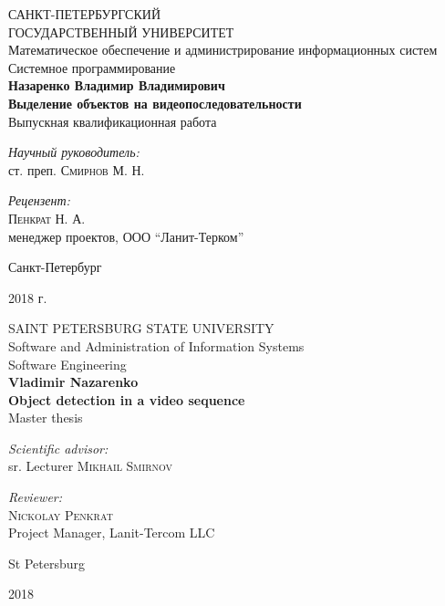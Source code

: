 \documentclass[aps,%
14pt,%
final,%
oneside,
onecolumn,%
musixtex, %
superscriptaddress,%
centertags]{extarticle} %
\begin{document}
\begin{titlepage} 
\begin{center}
{\large САНКТ-ПЕТЕРБУРГСКИЙ \\ ГОСУДАРСТВЕННЫЙ УНИВЕРСИТЕТ} \\[1.0cm]
{\large Математическое обеспечение и администрирование информационных систем} \\[0.2cm]
{\large Системное программирование} \\[3.5cm]
 
\textbf{\Large Назаренко Владимир Владимирович} \\[1cm]
\textbf{\LARGE Выделение объектов на видеопоследовательности}\\[1.0cm]
{\Large Выпускная квалификационная работа} \\[3.5cm]

\begin{flushright} \large
\emph{Научный руководитель:} \\
ст. преп. \textsc{Смирнов М. Н.}
\end{flushright}
 \begin{flushright} \large
\emph{Рецензент:} \\
\textsc{Пенкрат Н. А.} \\
менеджер проектов, ООО ``Ланит-Терком''
\end{flushright}
\vfill 

{\large {Санкт-Петербург}} \par
{\large {2018 г.}}
\end{center} 
\end{titlepage}

\begin{titlepage} 
\begin{center}
{\large SAINT PETERSBURG STATE UNIVERSITY} \\[1.0cm]
{\large Software and Administration of Information Systems} \\[0.2cm]
{\large Software Engineering} \\[3.5cm]
 
\textbf{\Large Vladimir Nazarenko} \\[1cm]
\textbf{\LARGE Object detection in a video sequence}\\[1.0cm]
{\Large Master thesis} \\[3.5cm]

\begin{flushright} \large
\emph{Scientific advisor:} \\
sr. Lecturer \textsc{Mikhail Smirnov}
\end{flushright}
 \begin{flushright} \large
\emph{Reviewer:} \\
\textsc{Nickolay Penkrat} \\
Project Manager, Lanit-Tercom LLC
\end{flushright}
\vfill 

{\large {St Petersburg}} \par
{\large {2018}}
\end{center} 
\end{titlepage}
\end{document}
